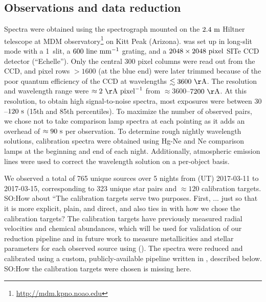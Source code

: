 \documentclass[modern, letterpaper]{aastex61}
\newcommand{\smoh}[1]{\textcolor{mediumpersianblue}{SO:#1}}
\begin{document}
\subsection{Observations and data reduction}\label{sec:reduction}

Spectra were obtained using the  spectrograph mounted on the
$2.4~{\rm m}$ Hiltner telescope at MDM
observatory\footnote{\url{http://mdm.kpno.noao.edu}} on Kitt Peak (Arizona).
 was set up in long-slit mode with a 1\arcsec\ slit, a $600~{\rm
line}~{\rm mm}^{-1}$ grating, and a $2048\times2048~{\rm pixel}$ SITe CCD
detector (``Echelle'').
Only the central 300 pixel columns were read out from the CCD, and pixel rows
$>1600$ (at the blue end) were later trimmed because of the poor quantum
efficiency of the CCD at wavelengths $\lesssim 3600~{\rm \AA}$.
The resolution and wavelength range were $\approx2~{\rm \AA}~{\rm pixel}^{-1}$
from $\approx 3600$--$7200~{\rm \AA}$.
At this resolution, to obtain high signal-to-noise spectra, most exposures were
between $30$--$120~{\rm s}$ (15th and 85th percentiles).
To maximize the number of observed pairs, we chose not to take
comparison lamp spectra at each pointing as it adds an overhead of $\approx
90~{\rm s}$ per observation.
To determine rough nightly wavelength solutions, calibration spectra were obtained using
Hg-Ne and Ne comparison lamps at the beginning and end of each night.
Additionally, atmospheric emission lines were used to correct the wavelength solution on a
per-object basis.

We observed a total of 765 unique sources over 5 nights from (UT) 2017-03-11 to
2017-03-15, corresponding to 323 unique star pairs and $\approx 120$
calibration targets.
\smoh{How about ``The calibration targets serve two purposes. First, ...
  just so that it is more explicit, plain, and direct, and also ties in
  with how we chose the calibration targets?}
The calibration targets have previously measured radial velocities and chemical
abundances, which will be used for validation of our reduction pipeline and in
future work to measure metallicities and stellar parameters for each observed
source using  (\citealt{Ness:2015}).
The spectra were reduced and calibrated using a custom, publicly-available
pipeline written in \python, described below.
\smoh{How the calibration targets were chosen is missing here.}
\end{document}
